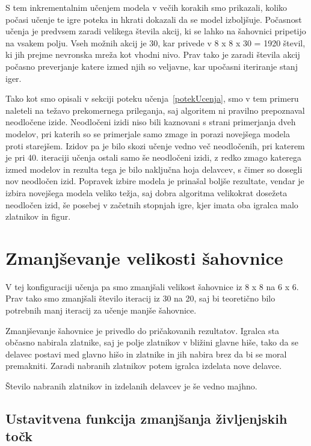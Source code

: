 \documentclass[a4paper, 12pt]{book}
\begin{document}
S tem inkrementalnim učenjem modela v večih korakih smo prikazali, koliko počasi učenje te igre poteka in hkrati dokazali da se model izboljšuje.
Počasnost učenja je predvsem zaradi velikega števila akcij, ki se lahko na šahovnici pripetijo na vsakem polju.
Vseh možnih akcij je 30, kar privede v 8 x 8 x 30 = 1920 števil, ki jih prejme nevronska mreža kot vhodni nivo.
Prav tako je zaradi števila akcij počasno preverjanje katere izmed njih so veljavne, kar upočasni iteriranje stanj iger.

Tako kot smo opisali v sekciji poteku učenja~\ref{potekUcenja}, smo v tem primeru naleteli na težavo prekomernega prileganja, saj algoritem ni pravilno prepoznaval neodločene izide.
Neodločeni izidi niso bili kaznovani s strani primerjanja dveh modelov, pri katerih so se primerjale samo zmage in porazi novejšega modela proti starejšem.
Izidov pa je bilo skozi učenje vedno več neodločenih, pri katerem je pri 40. iteraciji učenja ostali samo še neodločeni izidi, z redko zmago katerega izmed modelov in rezulta tega je bilo naključna hoja delavcev, s čimer so dosegli nov neodločen izid.
Popravek izbire modela je prinašal boljše rezultate, vendar je izbira novejšega modela veliko težja, saj dobra algoritma velikokrat dosežeta neodločen izid, še posebej v začetnih stopnjah igre, kjer imata oba igralca malo zlatnikov in figur.
\section{Zmanjševanje velikosti šahovnice}
\label{resultFourth}

V tej konfiguraciji učenja pa smo zmanjšali velikost šahovnice iz 8 x 8 na 6 x 6.
Prav tako smo zmanjšali število iteracij iz 30 na 20, saj bi teoretično bilo potrebnih manj iteracij za učenje manjše šahovnice.

Zmanjševanje šahovnice je privedlo do pričakovanih rezultatov.
Igralca sta občasno nabirala zlatnike, saj je polje zlatnikov v bližini glavne hiše, tako da se delavec postavi med glavno hišo in zlatnike in jih nabira brez da bi se moral premakniti.
Zaradi nabranih zlatnikov potem igralca izdelata nove delavce.

Število nabranih zlatnikov in izdelanih delavcev je še vedno majhno.

\subsection{Ustavitvena funkcija zmanjšanja življenjskih točk}
\end{document}
